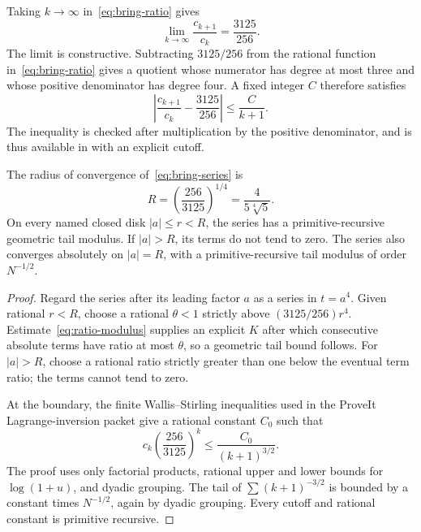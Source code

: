 Taking \(k\to\infty\) in~\eqref{eq:bring-ratio} gives
\[
 \lim_{k\to\infty}\frac{c_{k+1}}{c_k}=\frac{3125}{256}.
\]
The limit is constructive.  Subtracting \(3125/256\) from the rational function
in~\eqref{eq:bring-ratio} gives a quotient whose numerator has degree at most
three and whose positive denominator has degree four.  A fixed integer
\(C\) therefore satisfies
\begin{equation}\label{eq:ratio-modulus}
 \left|\frac{c_{k+1}}{c_k}-\frac{3125}{256}\right|
 \le\frac{C}{k+1}.
\end{equation}
The inequality is checked after multiplication by the positive denominator,
and is thus available in \ipra{} with an explicit cutoff.

\begin{theorem}\label{thm:bring-radius}
The radius of convergence of~\eqref{eq:bring-series} is
\begin{equation}\label{eq:bring-radius}
 R=\left(\frac{256}{3125}\right)^{1/4}
   =\frac{4}{5\sqrt[4]{5}}.
\end{equation}
On every named closed disk \(|a|\le r<R\), the series has a
primitive-recursive geometric tail modulus.  If \(|a|>R\), its terms do not
tend to zero.  The series also converges absolutely on \(|a|=R\), with a
primitive-recursive tail modulus of order \(N^{-1/2}\).
\end{theorem}

\begin{proof}
Regard the series after its leading factor \(a\) as a series in \(t=a^4\).
Given rational \(r<R\), choose a rational \(\theta<1\) strictly above
\((3125/256)r^4\).  Estimate~\eqref{eq:ratio-modulus} supplies an explicit
\(K\) after which consecutive absolute terms have ratio at most \(\theta\),
so a geometric tail bound follows.  For \(|a|>R\), choose a rational ratio
strictly greater than one below the eventual term ratio; the terms cannot tend
to zero.

At the boundary, the finite Wallis--Stirling inequalities used in the ProveIt
Lagrange-inversion packet give a rational constant \(C_0\) such that
\[
 c_k\left(\frac{256}{3125}\right)^k
 \le \frac{C_0}{(k+1)^{3/2}}.
\]
The proof uses only factorial products, rational upper and lower bounds for
\(\log(1+u)\), and dyadic grouping.  The tail of
\(\sum(k+1)^{-3/2}\) is bounded by a constant times \(N^{-1/2}\), again by
dyadic grouping.  Every cutoff and rational constant is primitive recursive.
\end{proof}

